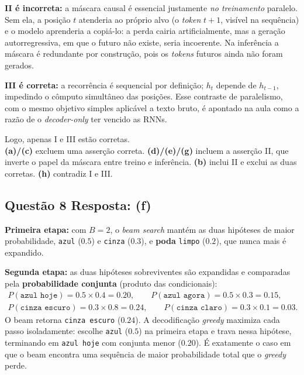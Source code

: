 \documentclass[11pt,a4paper]{article}
\begin{document}
\textbf{II é incorreta:} a máscara causal é essencial justamente \emph{no treinamento} paralelo. Sem ela, a posição $t$ atenderia ao próprio alvo (o \textit{token} $t{+}1$, visível na sequência) e o modelo aprenderia a copiá-lo: a perda cairia artificialmente, mas a geração autorregressiva, em que o futuro não existe, seria incoerente. Na inferência a máscara é redundante por construção, pois os \textit{tokens} futuros ainda não foram gerados.

\textbf{III é correta:} a recorrência é sequencial por definição; $h_t$ depende de $h_{t-1}$, impedindo o cômputo simultâneo das posições. Esse contraste de paralelismo, com o mesmo objetivo simples aplicável a texto bruto, é apontado na aula como a razão de o \textit{decoder-only} ter vencido as RNNs.

Logo, apenas I e III estão corretas.\\
\textbf{(a)/(c)} excluem uma asserção correta.
\textbf{(d)/(e)/(g)} incluem a asserção II, que inverte o papel da máscara entre treino e inferência.
\textbf{(b)} inclui II e exclui as duas corretas.
\textbf{(h)} contradiz I e III.

\subsection*{Questão 8 \textemdash{} Resposta: (f)}
\textbf{Primeira etapa:} com $B = 2$, o \textit{beam search} mantém as duas hipóteses de maior probabilidade, \texttt{azul} ($0.5$) e \texttt{cinza} ($0.3$), e \textbf{poda} \texttt{limpo} ($0.2$), que nunca mais é expandido.

\textbf{Segunda etapa:} as duas hipóteses sobreviventes são expandidas e comparadas pela \textbf{probabilidade conjunta} (produto das condicionais):
\begin{gather*}
P(\texttt{azul hoje}) = 0.5 \times 0.4 = 0.20,
\qquad
P(\texttt{azul agora}) = 0.5 \times 0.3 = 0.15,\\
P(\texttt{cinza escuro}) = 0.3 \times 0.8 = 0.24,
\qquad
P(\texttt{cinza claro}) = 0.3 \times 0.1 = 0.03.
\end{gather*}
O beam retorna \texttt{cinza escuro} ($0.24$). A decodificação \textit{greedy} maximiza cada passo isoladamente: escolhe \texttt{azul} ($0.5$) na primeira etapa e trava nessa hipótese, terminando em \texttt{azul hoje} com conjunta menor ($0.20$). É exatamente o caso em que o beam encontra uma sequência de maior probabilidade total que o \textit{greedy} perde.
\end{document}
